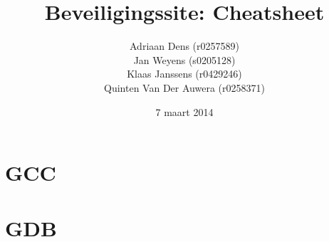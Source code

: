 \documentclass[a4paper,11pt]{report}
\begin{document}
\title{Beveiligingssite: Cheatsheet}
\date{7 maart 2014}
\author{Adriaan Dens (r0257589)\\
	Jan Weyens (s0205128)\\
	Klaas Janssens (r0429246)\\
	Quinten Van Der Auwera (r0258371)
}	

\maketitle

\chapter{GCC}

\newpage

\chapter{GDB}



\end{document}
